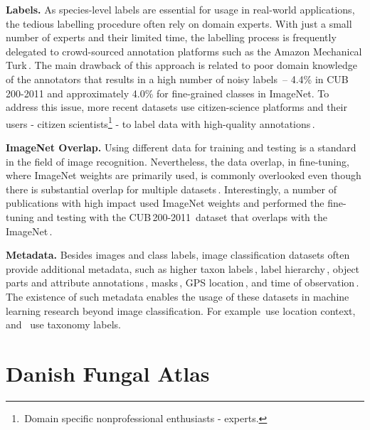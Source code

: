 \documentclass[10pt,twocolumn,letterpaper]{article}
\begin{document}
\textbf{Labels.} As species-level labels are essential for usage in real-world applications, the tedious labelling procedure often rely on domain experts. With just a small number of experts and their limited time, the labelling process is frequently delegated to crowd-sourced annotation platforms such as the Amazon Mechanical Turk\,\cite{imagenet, dataset-dataset-DOGS, dataset-CUBS}. The main drawback of this approach is related to poor domain knowledge of the annotators that results in a high number of noisy labels\,\cite{nabirds_dataset} -- 4.4\% in CUB\,200-2011  and approximately 4.0\% for fine-grained classes in ImageNet. To address this issue, more recent datasets use citizen-science platforms and their users - citizen scientists\footnote{\,Domain specific nonprofessional enthusiasts - experts.} - to label data with high-quality annotations\,\cite{nabirds_dataset, inaturalist2017}.

\textbf{ImageNet Overlap.} Using different data for training and testing is a standard in the field of image recognition. Nevertheless, the data overlap, in fine-tuning, where ImageNet weights are primarily used, is commonly overlooked even though there is substantial overlap for multiple datasets\,\cite{vegfru_dataset, dogsnap_dataset, dataset-CUBS}. Interestingly, a number of publications with high impact used ImageNet weights and performed the fine-tuning and testing with the CUB\,200-2011\,\cite{dataset-CUBS} dataset that overlaps with the ImageNet\,\cite{ft_imagenet_7, ft_imagenet_2, ft_imagenet_4, ft_imagenet_3, ft_imagenet_5, ft_imagenet_6, ft_imagenet_8, ft_imagenet_9, ft_imagenet_1}.

\textbf{Metadata.} Besides images and class labels, image classification datasets often provide additional metadata, such as higher taxon labels\,\cite{plantclef2015, inaturalist2017}, label hierarchy\,\cite{imagenet, vegfru_dataset, aircafts}, object parts and attribute annotations\,\cite{plantclef2015, nabirds_dataset, dataset-CUBS}, masks\,\cite{dataset-CUBS}, GPS location\,\cite{plantclef2015}, and time of observation\,\cite{plantclef2015}. The existence of such metadata enables the usage of these datasets in machine learning research beyond image classification. For example\,\cite{Aodha_2019_ICCV, bargoti2016image, ellen2019improving} use location context, and \,\cite{goo2016taxonomy} use taxonomy labels.

\section{Danish Fungal Atlas}
\end{document}
